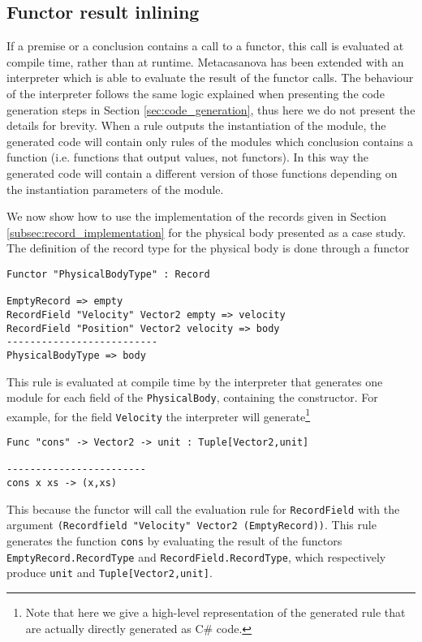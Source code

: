 \subsection{Functor result inlining}
If a premise or a conclusion contains a call to a functor, this call is evaluated at compile time, rather than at runtime. Metacasanova has been extended with an interpreter which is able to evaluate the result of the functor calls. The behaviour of the interpreter follows the same logic explained when presenting the code generation steps in Section \ref{sec:code_generation}, thus here we do not present the details for brevity. When a rule outputs the instantiation of the module, the generated code will contain only rules of the modules which conclusion contains a function (i.e. functions that output values, not functors). In this way the generated code will contain a different version of those functions depending on the instantiation parameters of the module.

We now show how to use the implementation of the records given in Section \ref{subsec:record_implementation} for the physical body presented as a case study.
The definition of the record type for the physical body is done through a functor

\begin{lstlisting}
Functor "PhysicalBodyType" : Record

EmptyRecord => empty
RecordField "Velocity" Vector2 empty => velocity
RecordField "Position" Vector2 velocity => body
--------------------------
PhysicalBodyType => body
\end{lstlisting}

This rule is evaluated at compile time by the interpreter that generates one module for each field of the \texttt{PhysicalBody}, containing the constructor. For example, for the field \texttt{Velocity} the interpreter will generate\footnote{Note that here we give a high-level representation of the generated rule that are actually directly generated as C\# code.}

\begin{lstlisting}
Func "cons" -> Vector2 -> unit : Tuple[Vector2,unit]

------------------------
cons x xs -> (x,xs)
\end{lstlisting}

This because the functor will call the evaluation rule for \texttt{RecordField} with the argument \texttt{(Recordfield "Velocity" Vector2 (EmptyRecord))}. This rule generates the function \texttt{cons} by evaluating the result of the functors\\ \texttt{EmptyRecord.RecordType} and \texttt{RecordField.RecordType}, which respectively produce \texttt{unit} and \texttt{Tuple[Vector2,unit]}.

